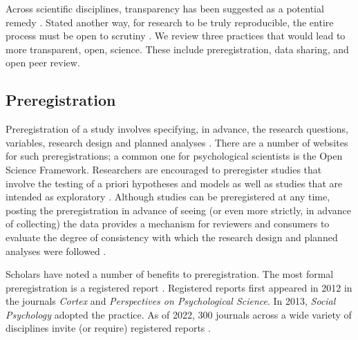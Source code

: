 \documentclass[
  11pt,
]{book}
\begin{document}
Across scientific disciplines, transparency has been suggested as a potential remedy \citep{open_science_collaboration_estimating_2015, vantveer_pre-registration_2016}. Stated another way, for research to be truly reproducible, the entire process must be open to scrutiny \citep{stevens_replicability_2017}. We review three practices that would lead to more transparent, open, science. These include preregistration, data sharing, and open peer review.

\subsection{Preregistration}\label{preregistration}

Preregistration of a study involves specifying, in advance, the research questions, variables, research design and planned analyses \citep{stevens_replicability_2017}. There are a number of websites for such preregistrations; a common one for psychological scientists is the Open Science Framework. Researchers are encouraged to preregister studies that involve the testing of a priori hypotheses and models as well as studies that are intended as exploratory \citep{bosnjak_template_2021}. Although studies can be preregistered at any time, posting the preregistration in advance of seeing (or even more strictly, in advance of collecting) the data provides a mechanism for reviewers and consumers to evaluate the degree of consistency with which the research design and planned analyses were followed \citep{bosnjak_template_2021, haven_preregistering_2020}.

Scholars have noted a number of benefits to preregistration. The most formal preregistration is a registered report \citep{osf_open_2022}. Registered reports first appeared in 2012 in the journals \emph{Cortex} and \emph{Perspectives on Psychological Science}. In 2013, \emph{Social Psychology} adopted the practice. As of 2022, 300 journals across a wide variety of disciplines invite (or require) registered reports \citep{chambers_past_2022}.
\end{document}
